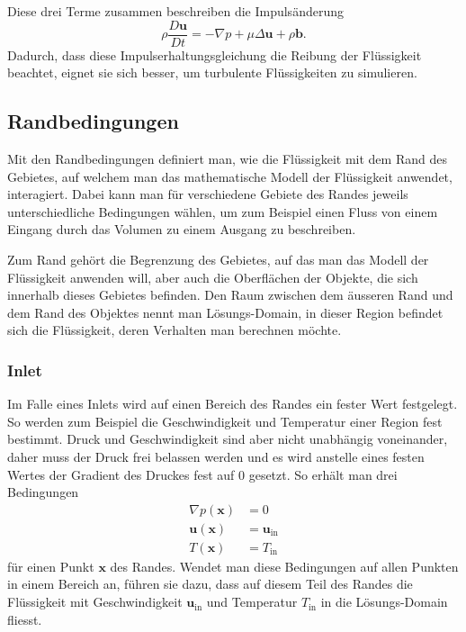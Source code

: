 Diese drei Terme zusammen beschreiben die Impulsänderung 
\begin{equation}
\rho \frac{D\mathbf{u}}{Dt}
=
- \nabla p + \mu \Delta \mathbf{u} +\rho \mathbf{b} 
.\end{equation}
Dadurch, dass diese Impulserhaltungsgleichung die Reibung der Flüssigkeit beachtet, eignet sie sich besser, um turbulente Flüssigkeiten zu simulieren. 

\subsection{Randbedingungen}
\label{openfoam:randbedingungen}
Mit den Randbedingungen definiert man, wie die Flüssigkeit mit dem Rand des Gebietes, auf welchem man das mathematische Modell der Flüssigkeit anwendet, interagiert.
Dabei kann man für verschiedene Gebiete des Randes jeweils unterschiedliche Bedingungen wählen, um zum Beispiel einen Fluss von einem Eingang durch das Volumen zu einem Ausgang zu beschreiben.

Zum Rand gehört die Begrenzung des Gebietes, auf das man das Modell der Flüssigkeit anwenden will, aber auch die Oberflächen der Objekte, die sich innerhalb dieses Gebietes befinden.
Den Raum zwischen dem äusseren Rand und dem Rand des Objektes nennt man Lösungs-Domain, in dieser Region befindet sich die Flüssigkeit, deren Verhalten man berechnen möchte.
%

\subsubsection{Inlet}
%
Im Falle eines Inlets wird auf einen Bereich des Randes ein fester Wert festgelegt. 
So werden zum Beispiel die Geschwindigkeit und Temperatur einer Region fest bestimmt.
Druck und Geschwindigkeit sind aber nicht unabhängig voneinander, daher muss der Druck frei belassen werden und es wird anstelle eines festen Wertes der Gradient des Druckes fest auf 0 gesetzt.
So erhält man drei Bedingungen 
\begin{align*}
 \nabla p(\mathbf{x}) &= 0 \\
 \mathbf{u}(\mathbf{x}) &= \mathbf{u}_{\text{in}} \\
 T(\mathbf{x}) &= T_{\text{in}}
\end{align*}
für einen Punkt $\mathbf{x}$ des Randes.
Wendet man diese Bedingungen auf allen Punkten in einem Bereich an, führen sie dazu, dass auf diesem Teil des Randes die Flüssigkeit mit Geschwindigkeit $\mathbf{u}_{\text{in}}$ und Temperatur $T_{\text{in}}$ in die Lösungs-Domain fliesst.

